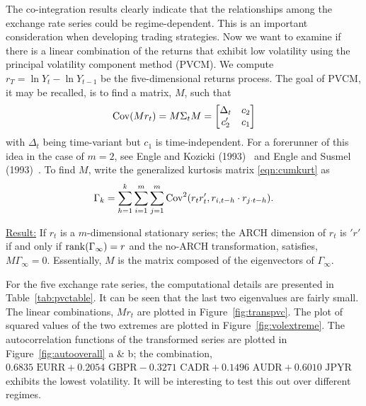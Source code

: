 	
The co-integration results clearly indicate that the relationships among the exchange rate series could be regime-dependent. This is an important consideration when developing trading strategies. Now we want to examine if there is a linear combination of the returns that exhibit low volatility using the principal volatility component method (PVCM). We compute $r_T=\ln Y_t - \ln Y_{t-1}$ be the five-dimensional returns process. The goal of PVCM, it may be recalled, is to find a matrix, $M$, such that
	\begin{equation} \label{eqn:covmatrixM}
	\cov(Mr_t)= M \Sigma_t M= 
	\begin{bmatrix}
	\Delta_t & c_2 \\
	c_2' & c_1
	\end{bmatrix}
	\end{equation}	
with $\Delta_t$ being time-variant but $c_1$ is time-independent. For a forerunner of this idea in the case of $m= 2$, see Engle and Kozicki (1993)~\cite{engle1993testing} and Engle and Susmel (1993)~\cite{engle1993common}. To find $M$, write the generalized kurtosis matrix \eqref{eqn:cumkurt} as
	\begin{equation} \label{eqn:gammakurt}
	\Gamma_k= \sum_{h=1}^k \sum_{i=1}^m \sum_{j=1}^m \cov^2(r_tr_t', r_{i,t-h} \cdot r_{j \cdot t-h}).
	\end{equation}	


\noindent\underline{Result:} If $r_t$ is a $m$-dimensional stationary series; the ARCH dimension of $r_t$ is $'r'$ if and only if $\operatorname{rank}(\Gamma_\infty)= r$ and the no-ARCH transformation, satisfies, $M \Gamma_\infty= 0$. Essentially, $M$ is the matrix composed of the eigenvectors of $\Gamma_\infty$.


For the five exchange rate series, the computational details are presented in Table~\ref{tab:pvctable}. It can be seen that the last two eigenvalues are fairly small. The linear combinations, $Mr_t$ are plotted in Figure~\ref{fig:transpvc}. The plot of squared values of the two extremes are plotted in Figure~\ref{fig:volextreme}. The autocorrelation functions of the transformed series are plotted in Figure~\ref{fig:autooverall} a \& b; the combination, $0.6835 \text{ EURR} + 0.2054 \text{ GBPR} - 0.3271 \text{ CADR} + 0.1496 \text{ AUDR} + 0.6010 \text{ JPYR}$ exhibits the lowest volatility. It will be interesting to test this out over different regimes.

